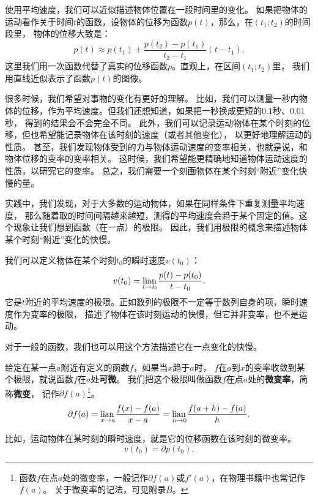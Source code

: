 \documentclass[12pt,UTF8,fontset=none]{ctexbook}
\begin{document}
使用平均速度，我们可以近似描述物体位置在一段时间里的变化。
如果把物体的运动看作关于时间$t$的函数，设物体的位移为函数$p(t)$，那么，在$(t_1; t_2)$的时间段里，
物体的位移大致是：
$$ p(t) \approx p(t_1) + \frac{p(t_2) - p(t_1)}{t_2 - t_1}(t - t_1).$$
这里我们用一次函数代替了真实的位移函数$p$。直观上，在区间$(t_1; t_2)$里，
我们用直线近似表示了函数$p(t)$的图像。

很多时候，我们希望对事物的变化有更好的理解。
比如，我们可以测量一秒内物体的位移，作为平均速度。但我们还想知道，如果把一秒换成更短的$0.1$秒、$0.01$秒，
得到的结果会不会完全不同。
此外，我们可以记录运动物体在某个时刻的位移，但也希望能记录物体在该时刻的速度（或者其他变化），
以更好地理解运动的性质。
甚至，我们发现物体受到的力与物体运动速度的变率相关，也就是说，和物体位移的变率的变率相关。
这时候，我们希望能更精确地知道物体运动速度的性质，以研究它的变率。
总之，我们需要一个刻画物体在某个时刻“附近”变化快慢的量。

实践中，我们发现，对于大多数的运动物体，如果在同样条件下重复测量平均速度，
那么随着取的时间间隔越来越短，测得的平均速度会趋于某个固定的值。这个现象让我们想到函数（在一点）的极限。
因此，我们用极限的概念来描述物体某个时刻“附近”变化的快慢。

我们可以定义物体在某个时刻$t_0$的瞬时速度$v(t_0)$：
$$ v(t_0) = \underset{t\to t_0}{\operatorname{lian}\,} \frac{p(t) - p(t_0)}{t - t_0}.$$
它是$t$附近的平均速度的极限。正如数列的极限不一定等于数列自身的项，瞬时速度作为变率的极限，
描述了物体在该时刻运动的快慢，但它并非变率，也不是运动。

对于一般的函数，我们也可以用这个方法描述它在一点变化的快慢。

\begin{df}\label{df:2-1-0}
    给定在某一点$a$附近有定义的函数$f$，如果当$x$趋于$a$时，
    $f$在$a$到$x$的变率收敛到某个极限，就说函数$f$在$a$处\textbf{可微}。
    我们把这个极限叫做函数$f$在点$a$处的\textbf{微变率}，简称\textbf{微变}，
    记作$\partial f(a)$\footnote{函数$f$在点$a$处的微变率，一般记作$\partial f(a)$或$f'(a)$，在物理书籍中也常记作$\dot{f}(a)$。
    关于微变率的记法，可见附录$B$。}。
    $$ \partial f(a) = \underset{x\to a}{\operatorname{lian}\,} \frac{f(x) - f(a)}{x - a} = \underset{h\to 0}{\operatorname{lian}\,} \frac{f(a + h) - f(a)}{h}.$$
\end{df}

比如，运动物体在某时刻的瞬时速度，就是它的位移函数在该时刻的微变率。
$$ v(t_0) = \partial p(t_0).$$
\end{document}

